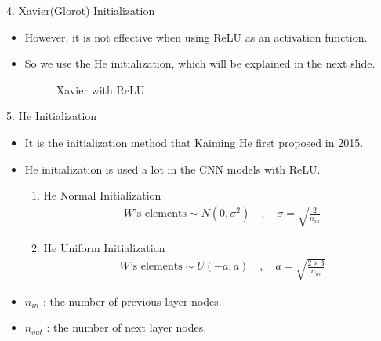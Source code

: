 \documentclass{beamer}
\begin{document}
	\begin{frame}{4. Xavier(Glorot) Initialization}
		\begin{itemize}
			\item However, it is not effective when using ReLU as an activation function.
			\vspace{10pt}
			\item So we use the He initialization, which will be explained in the next slide.
			\begin{figure}[h]
				\centering
				\quad
				\caption{Xavier with ReLU}
				\label{fig:reluxavier}
			\end{figure}
		\end{itemize}
	\end{frame}


	\begin{frame}{5. He Initialization}
		\begin{itemize}
			\item It is the initialization method that Kaiming He first proposed in 2015\cite{he}.
			\item He initialization is used a lot in the CNN models with ReLU.
			\vspace{10pt}
			\begin{enumerate}
				\vspace{3pt}
				\item He Normal Initialization
				\begin{gather*}
				W\text{'s elements} \sim N(0,\sigma^2) \quad , \quad \sigma = \sqrt{\frac{2}{n_{in}}}  
				\end{gather*}
				\vspace{3pt}
				\item He Uniform Initialization
				\begin{gather*}
				W\text{'s elements} \sim U(-a,a) \quad , \quad a = \sqrt{\frac{2\times 3}{n_{in}}}  
				\end{gather*}
				\vspace{3pt}
			\end{enumerate}	
			\item $n_{in}$  : the number of previous layer nodes.
			\item $n_{out}$ : the number of next layer nodes.
		\end{itemize}
	\end{frame}	
\end{document}
